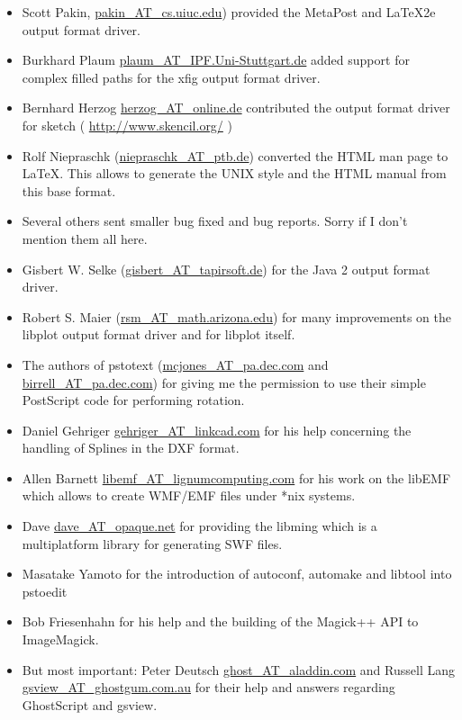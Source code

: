 \documentclass[english,a4paper]{article}
\let\URL\url \let\Email\url \let\File\url
\begin{document}
\begin{itemize}
  \item Scott Pakin,  \Email{pakin_AT_cs.uiuc.edu})   provided the MetaPost and LaTeX2e output format driver.
  
  \item Burkhard Plaum \Email{plaum_AT_IPF.Uni-Stuttgart.de} added support for
     complex filled paths for the xfig output format driver.

  \item Bernhard Herzog \Email{herzog_AT_online.de} contributed the output format driver for
     sketch ( \URL{http://www.skencil.org/} )

  \item Rolf Niepraschk (\Email{niepraschk_AT_ptb.de}) converted the HTML man page
     to LaTeX. This allows to generate the UNIX style and the HTML manual from this
     base format.

  \item Several others sent smaller bug fixed and bug reports. Sorry if I don't
     mention them all here.

  \item Gisbert W. Selke (\Email{gisbert_AT_tapirsoft.de}) for the Java 2 output format driver.
     
  \item Robert S. Maier (\Email{rsm_AT_math.arizona.edu}) for many improvements on
	the libplot output format driver and for libplot itself.
  \item The authors of pstotext (\Email{mcjones_AT_pa.dec.com} and \Email{birrell_AT_pa.dec.com}) 
	for giving me the permission to use their simple PostScript code for 
	performing rotation.
  \item  Daniel Gehriger \Email{gehriger_AT_linkcad.com} for his help concerning the handling of Splines in the DXF format. 
  \item Allen Barnett \Email{libemf_AT_lignumcomputing.com} for his work on the libEMF which allows to create WMF/EMF files under *nix systems.
  \item Dave \Email{dave_AT_opaque.net} for providing the libming which is a multiplatform library for generating SWF files.
  \item Masatake Yamoto for the introduction of autoconf, automake and libtool into pstoedit
  \item Bob Friesenhahn for his help and the building of the Magick++ API to ImageMagick.
  \item But most important: Peter Deutsch \Email{ghost_AT_aladdin.com} and Russell
     Lang \Email{gsview_AT_ghostgum.com.au} for their help and answers regarding
     GhostScript and gsview.

\end{itemize}
\end{document}
